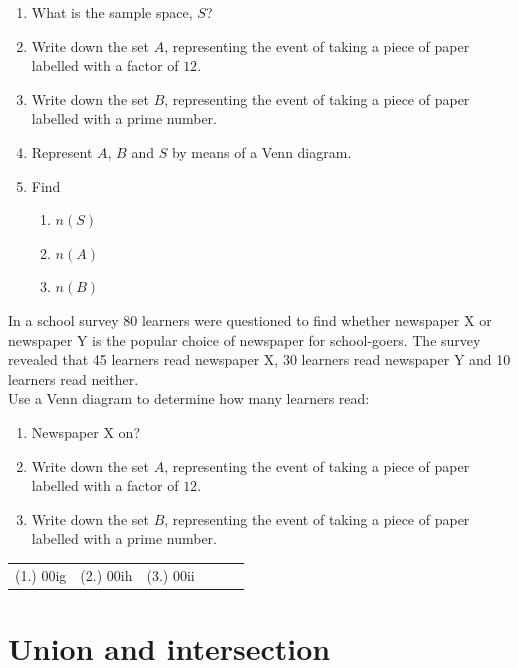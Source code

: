 \begin{exercises}{}
{\begin{enumerate}[noitemsep, label=\textbf{(\alph*)} ]
    \item What is the sample space, $S$?
    \item Write down the set $A$, representing the event of taking a
      piece of paper labelled with a factor of $12$.
    \item Write down the set $B$, representing the event of taking a
      piece of paper labelled with a prime number.
    \item Represent $A$, $B$ and $S$ by means of a Venn diagram.
    \item Find
      \begin{enumerate}[noitemsep, label=\textbf{\roman*.} ]
      \item $n\left(S\right)$
      \item $n\left(A\right)$
      \item $n\left(B\right)$
      \end{enumerate}
    \end{enumerate}
  \item In a school survey 80 learners were questioned to find whether newspaper X or newspaper Y is the popular choice of newspaper for school-goers.  The survey revealed that 45 learners read newspaper X, 30 learners read newspaper Y and 10 learners read neither.\\
  Use a Venn diagram to determine how many learners read:
    \begin{enumerate}[noitemsep, label=\textbf{(\alph*)} ]
    \item Newspaper X on?
    \item Write down the set $A$, representing the event of taking a
      piece of paper labelled with a factor of $12$.
    \item Write down the set $B$, representing the event of taking a
      piece of paper labelled with a prime number.
  \end{enumerate}
\practiceinfo

\begin{tabular}{cccccc}
    (1.) 00ig& (2.) 00ih& (3.) 00ii\\
  \end{tabular}
}
\end{exercises}

\section{Union and intersection}

